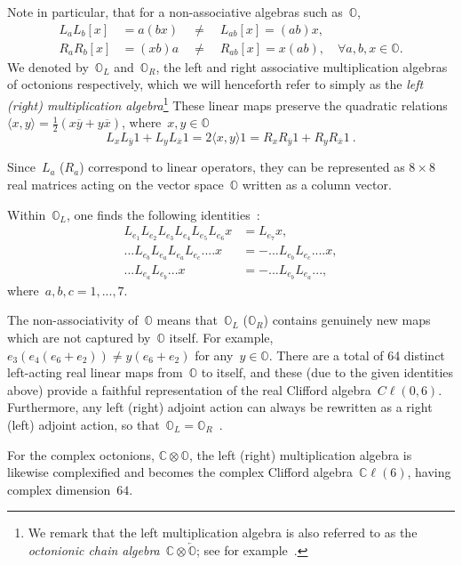 \documentclass[reqno,11pt]{amsart}
\numberwithin{equation}{section}
\newcommand{\C}{\mathbb{C}}
\newcommand{\1}{\mbox{\rm 1 \hspace{-1.05 em} 1}}
\newcommand{\bb}[1]{\mathbb{#1}}
\begin{document}
Note in particular, that for a non-associative algebras such as~$\bb{O}$, 
\begin{align*}
    L_aL_b[x] &=a(bx) \quad \neq \quad L_{ab}[x]=(ab)x,\\
    R_aR_b[x] &=(xb)a \quad \neq \quad R_{ab}[x]=x(ab),\quad\forall a,b,x\in\bb{O}.
\end{align*}
We denoted by~$\bb{O}_L$ and~$\bb{O}_R$, the left and right associative multiplication  algebras of octonions respectively, which we will henceforth refer to simply as the {\em{left (right) multiplication algebra}}\footnote{We remark that the left multiplication algebra is also referred to as the
{\em{octonionic chain algebra}}~$\C \otimes \overleftarrow{\mathbb{O}}$; see
for example~\cite{furey2016standard}.}
These linear maps preserve the quadratic relations~$\langle x,y\rangle=\frac{1}{2}(x\overline{y}+y\overline{x})$,
where~$x,y\in \bb{O}$
\[ L_xL_{\overline{y}}1+L_yL_{\overline{x}}1=2\langle x,y \rangle 1=R_xR_{\overline{y}}1+R_yR_{\overline{x}}1 \:. \]

Since~$L_a$ ($R_a$) correspond to linear operators, they can be represented as $8\times 8$ real matrices acting on the vector space~$\bb{O}$ written as a column vector.

Within~$\bb{O}_L$, one finds the following identities~\cite{dixon2013division,furey2016standard}:
\begin{align*}
    L_{e_1}L_{e_2}L_{e_3}L_{e_4}L_{e_5}L_{e_6}x &= L_{e_7}x,\\
    ...L_{e_b}L_{e_a}L_{e_a}L_{e_c}....x &= -...L_{e_b}L_{e_c}....x,\\
    ...L_{e_a}L_{e_b}...x &= -...L_{e_b}L_{e_a}...,
\end{align*}
where~$a,b,c=1,...,7$.

The non-associativity of~$\bb{O}$ means that~$\bb{O}_L$ ($\bb{O}_R$) contains genuinely new maps which are not captured by~$\bb{O}$ itself. For example, $e_3(e_4(e_6+e_2))\neq y(e_6+e_2)$ for any~$y\in\bb{O}$. 
There are a total of 64 distinct left-acting real linear maps from~$\bb{O}$ to itself, and these (due to the given identities above) provide a faithful representation of the real Clifford algebra~$C\ell(0,6)$. Furthermore, any left (right) adjoint action can always be rewritten as a right (left) adjoint action, so that~$\bb{O}_L=\bb{O}_R$~\cite{dixon2013division}.

For the complex octonions, $\bb{C}\otimes\bb{O}$, the left (right) multiplication algebra is likewise complexified and becomes the complex Clifford algebra~$\bb{C}\ell(6)$, having complex dimension~$64$. 
\end{document}
